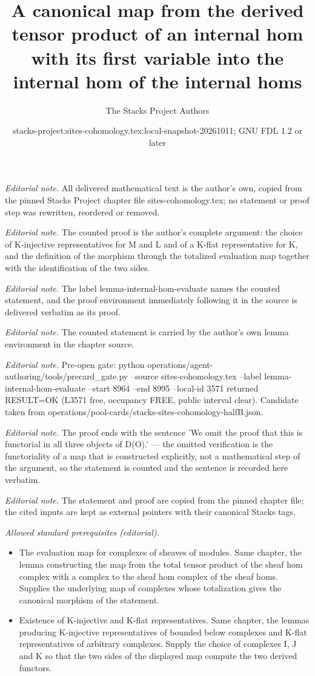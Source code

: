 \documentclass[10pt,a4paper]{amsart}
\title{A canonical map from the derived tensor product of an internal hom with its first variable into the internal hom of the internal homs}
\author{The Stacks Project Authors}
\date{stacks-project:sites-cohomology.tex:local-snapshot-20261011; GNU FDL 1.2 or later}
\theoremstyle{plain}
\theoremstyle{definition}
\theoremstyle{remark}
\numberwithin{equation}{subsection}
\begin{document}
\maketitle
\noindent\textit{Editorial note.} All delivered mathematical text is the author's own, copied from the pinned Stacks Project chapter file sites-cohomology.tex; no statement or proof step was rewritten, reordered or removed.\par\medskip
\noindent\textit{Editorial note.} The counted proof is the author's complete argument: the choice of K-injective representatives for M and L and of a K-flat representative for K, and the definition of the morphism through the totalized evaluation map together with the identification of the two sides.\par\medskip
\noindent\textit{Editorial note.} The label lemma-internal-hom-evaluate names the counted statement, and the proof environment immediately following it in the source is delivered verbatim as its proof.\par\medskip
\noindent\textit{Editorial note.} The counted statement is carried by the author's own lemma environment in the chapter source.\par\medskip
\noindent\textit{Editorial note.} Pre-open gate: python operations/agent-authoring/tools/precard\_gate.py --source sites-cohomology.tex --label lemma-internal-hom-evaluate --start 8964 --end 8995 --local-id 3571 returned RESULT=OK (L3571 free, occupancy FREE, public interval clear). Candidate taken from operations/pool-cards/stacks-sites-cohomology-halfB.json.\par\medskip
\noindent\textit{Editorial note.} The proof ends with the sentence 'We omit the proof that this is functorial in all three objects of D(O).' — the omitted verification is the functoriality of a map that is constructed explicitly, not a mathematical step of the argument, so the statement is counted and the sentence is recorded here verbatim.\par\medskip
\noindent\textit{Editorial note.} The statement and proof are copied from the pinned chapter file; the cited inputs are kept as external pointers with their canonical Stacks tags.\par\medskip
\noindent\textit{Allowed standard prerequisites (editorial).}\begin{itemize}
\item The evaluation map for complexes of sheaves of modules. Same chapter, the lemma constructing the map from the total tensor product of the sheaf hom complex with a complex to the sheaf hom complex of the sheaf homs. Supplies the underlying map of complexes whose totalization gives the canonical morphism of the statement.
\item Existence of K-injective and K-flat representatives. Same chapter, the lemmas producing K-injective representatives of bounded below complexes and K-flat representatives of arbitrary complexes. Supply the choice of complexes I, J and K so that the two sides of the displayed map compute the two derived functors.
\end{itemize}\medskip
\end{document}
